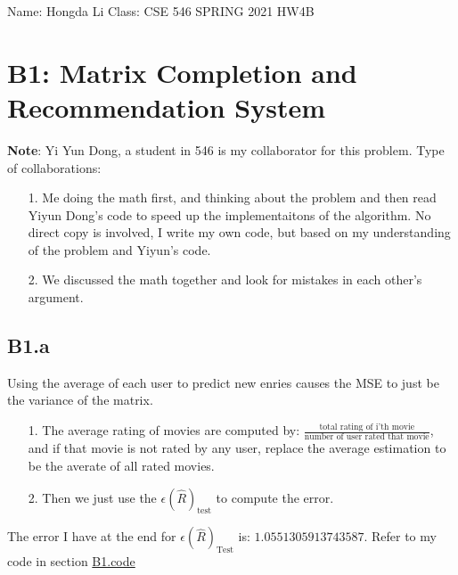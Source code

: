 \documentclass[]{article}
\begin{document}
\begin{center}
    Name: Hongda Li \quad Class: CSE 546 SPRING 2021 \quad HW4B    
\end{center}
\section*{B1: Matrix Completion and Recommendation System}
    \textbf{Note}: Yi Yun Dong, a student in 546 is my collaborator for this problem. Type of collaborations: 
    \begin{enumerate}
        \item[1.] Me doing the math first, and thinking about the problem and then read Yiyun Dong's code to speed up the implementaitons of the algorithm. No direct copy is involved, I write my own code, but based on my understanding of the problem and Yiyun's code. 
        \item[2.] We discussed the math together and look for mistakes in each other's argument.  
    \end{enumerate}

    \subsection*{B1.a}
        Using the average of each user to predict new enries causes the MSE to just be the variance of the matrix. 
        \begin{enumerate}
            \item[1.] The average rating of movies are computed by: $\frac{\text{total rating of i'th movie}}{\text{number of user rated that movie}}$, and if that movie is not rated by any user, replace the average estimation to be the averate of all rated movies. 
            \item[2.] Then we just use the $\epsilon(\hat{R})_\text{test}$ to compute the error. 
        \end{enumerate}
        The error I have at the end for $\epsilon(\hat{R})_\text{Test}$ is: $1.0551305913743587$. 
        Refer to my code in section \hyperref[B1.code]{B1.code}
\end{document}
